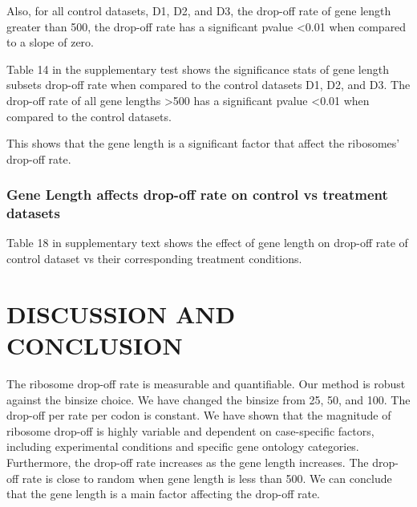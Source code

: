 \documentclass[a4,center,fleqn]{NAR}
\begin{document}
Also, for all control datasets, D1, D2, and D3, the drop-off rate of gene length greater than 500, the drop-off rate has a significant pvalue \textless 0.01 when compared to a slope of zero. 

Table 14 in the supplementary test shows  the  significance stats of gene length subsets  drop-off rate when compared to the control datasets D1, D2, and D3. The drop-off rate of all gene lengths \textgreater 500 has a significant pvalue \textless 0.01 when compared to the control datasets.  

This shows that the gene length is a significant factor that affect the ribosomes' drop-off rate. 

\subsubsection{Gene Length affects drop-off rate on control vs treatment datasets}



Table 18 in supplementary text shows the effect of gene length on drop-off rate of control dataset vs their corresponding treatment conditions. 

\section{DISCUSSION AND CONCLUSION}


The ribosome drop-off rate is measurable and quantifiable. Our method is robust against the binsize choice. We have changed the binsize from 25, 50, and 100. The drop-off per rate per codon is constant.  
We have shown that the magnitude of ribosome drop-off is highly variable and dependent on case-specific factors, including experimental conditions  and specific gene ontology categories. 
Furthermore, the drop-off rate increases as the gene length increases. The drop-off rate is close to random when gene length is less than 500. We can conclude that the gene length is a main factor affecting the drop-off rate.  
\end{document}
